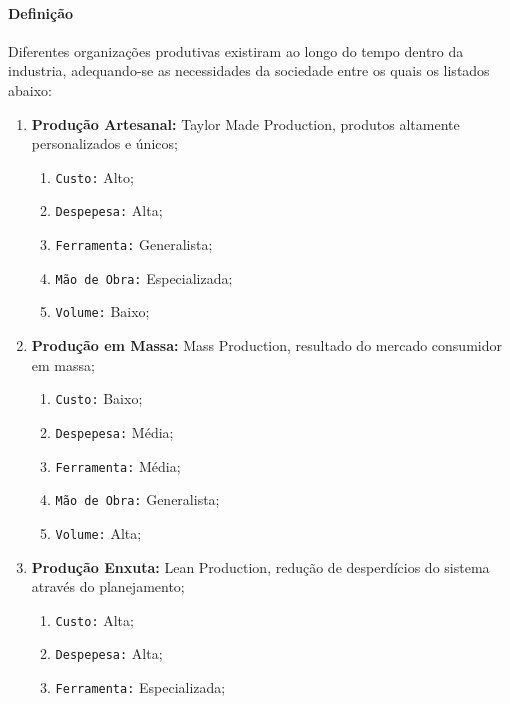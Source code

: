 \documentclass{article}
\begin{document}
            \paragraph{Definição}Diferentes organizações produtivas existiram ao longo do tempo dentro da industria, adequando-se as necessidades da sociedade entre os quais os listados abaixo:
                \begin{enumerate}[noitemsep]
                    \item \textbf{Produção Artesanal:} Taylor Made Production, produtos altamente personalizados e únicos;
                        \begin{enumerate}[noitemsep]
                            \item \texttt{Custo:} Alto;
                            \item \texttt{Despepesa:} Alta;
                            \item \texttt{Ferramenta:} Generalista;
                            \item \texttt{Mão de Obra:} Especializada;
                            \item \texttt{Volume:} Baixo;
                        \end{enumerate}
                    \item \textbf{Produção em Massa:} Mass Production, resultado do mercado consumidor em massa;
                        \begin{enumerate}[noitemsep]
                            \item \texttt{Custo:} Baixo;
                            \item \texttt{Despepesa:} Média;
                            \item \texttt{Ferramenta:} Média;
                            \item \texttt{Mão de Obra:} Generalista;
                            \item \texttt{Volume:} Alta;
                        \end{enumerate}
                    \item \textbf{Produção Enxuta:} Lean Production, redução de desperdícios do sistema através do planejamento;
                        \begin{enumerate}[noitemsep]
                            \item \texttt{Custo:} Alta;
                            \item \texttt{Despepesa:} Alta;
                            \item \texttt{Ferramenta:} Especializada;

\end{enumerate}
\end{enumerate}
\end{document}
